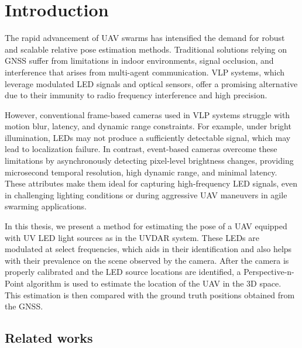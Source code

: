 
\chapter{Introduction\label{chap:introduction}}

The rapid advancement of \ac{UAV} swarms has intensified the demand for robust and scalable relative pose estimation methods.
Traditional solutions relying on \ac{GNSS} suffer from limitations in indoor environments, signal occlusion, and interference that arises from
multi-agent communication.
\ac{VLP} systems, which leverage modulated \ac{LED} signals and optical sensors, offer a promising alternative due to their immunity to radio
frequency interference and high precision.

However, conventional frame-based cameras used in \ac{VLP} systems struggle with motion blur, latency,
and dynamic range constraints. For example, under bright illumination, \ac{LED}s may not produce a sufficiently detectable signal,
which may lead to localization failure. In contrast, event-based cameras overcome these limitations by asynchronously detecting pixel-level
brightness changes, providing microsecond temporal resolution, high dynamic range, and minimal latency. These attributes make them ideal for
capturing high-frequency LED signals, even in challenging lighting conditions or during aggressive \ac{UAV} maneuvers in agile swarming applications.

In this thesis, we present a method for estimating the pose of a \ac{UAV} equipped with \ac{UV} \ac{LED} light sources as in the UVDAR system. \cite{walteruvdar}
These \ac{LED}s are modulated at select frequencies, which aids in their identification and also helps with their prevalence
on the scene observed by the camera. After the camera is properly calibrated and the LED source locations are identified, a Perspective-n-Point 
algorithm is used to estimate the location of the \ac{UAV} in the 3D space. This estimation is then compared with the ground truth positions obtained
from the \ac{GNSS}.


\section{Related works}

